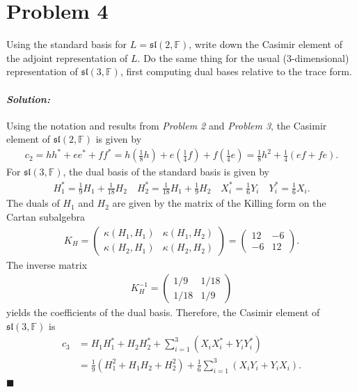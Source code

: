 \documentclass[12pt, a4paper]{article}
\newenvironment{solution}
  {\paragraph{\textit{Solution:}}\par\medskip}
  {\hfill$\blacksquare$\vspace{0.1cm}}
\begin{document}
\section*{Problem 4}
Using the standard basis for $L = \mathfrak{sl}(2, \mathbb{F})$, write down the Casimir element of the adjoint representation of $L$. Do the same thing for the usual (3-dimensional) representation of $\mathfrak{sl}(3, \mathbb{F})$, first computing dual bases relative to the trace form.
\begin{solution}
  Using the notation and results from \textit{Problem 2} and \textit{Problem 3}, the Casimir element of $\mathfrak{sl}(2, \mathbb{F})$ is given by 
  \begin{align*}
    c_2 = h h^* + e e^* + f f^* 
    =h\left(\frac{1}{8}h\right) + e\left(\frac{1}{4}f\right) + f\left(\frac{1}{4}e\right)
    = \frac{1}{8}h^2 + \frac{1}{4}(ef + fe).
  \end{align*}
  For $\mathfrak{sl}(3, \mathbb{F})$, the dual basis of the standard basis is given by 
  \begin{align*}
    H_1^* = \frac{1}{9}H_1 + \frac{1}{18}H_2\quad H_2^* = \frac{1}{18}H_1 + \frac{1}{9}H_2 \quad X_i^*=\frac{1}{6}Y_i \quad Y_i^*=\frac{1}{6}X_i.
  \end{align*}
  The duals of $H_1$ and $H_2$ are given by the matrix of the Killing form on the Cartan subalgebra 
  \begin{align*}
    K_H = \begin{pmatrix} \kappa(H_1, H_1) & \kappa(H_1, H_2) \\ \kappa(H_2, H_1) & \kappa(H_2, H_2) \end{pmatrix} = \begin{pmatrix} 12 & -6 \\ -6 & 12 \end{pmatrix}.
  \end{align*}
  The inverse matrix 
  \begin{align*}
    K_H^{-1} = \begin{pmatrix} 1/9 & 1/18 \\ 1/18 & 1/9 \end{pmatrix}
  \end{align*}
  yields the coefficients of the dual basis. Therefore, the Casimir element of $\mathfrak{sl}(3, \mathbb{F})$ is 
  \begin{align*}
    c_3 &= H_1 H_1^* + H_2 H_2^* + \sum_{i=1}^3 (X_i X_i^* + Y_i Y_i^*)\\
    & = \frac{1}{9}(H_1^2 + H_1 H_2 + H_2^2) + \frac{1}{6}\sum_{i=1}^3 (X_i Y_i + Y_i X_i).
  \end{align*}
\end{solution}
\end{document}
